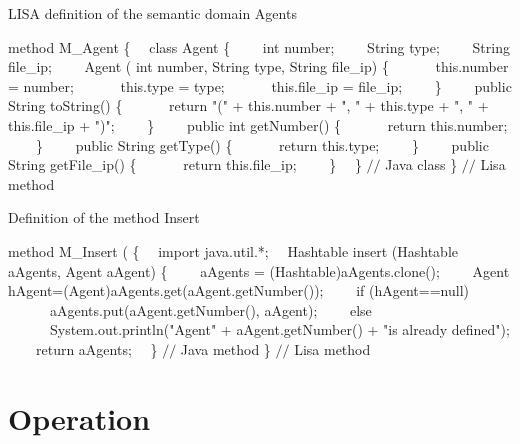 \documentclass[preprint, prX]{revtex4}
\begin{document}
\begin{algorithm}[tbh]
\caption{LISA definition of the semantic domain Agents}
\label{alg:m_ag_lisa}
\footnotesize
\begin{algorithmic}[1]
\STATE method M\_Agent \{
\STATE \ \ class Agent \{
\STATE \ \ \ \ int number;
\STATE \ \ \ \ String type;
\STATE \ \ \ \ String file\_ip;
\STATE \ \ \ \ Agent ( int number, String type, String file\_ip) \{
\STATE \ \ \ \ \ \ this.number = number;
\STATE \ \ \ \ \ \ this.type = type;
\STATE \ \ \ \ \ \ this.file\_ip = file\_ip;
\STATE \ \ \ \ \}
\STATE \ \ \ \ public String toString() \{
\STATE \ \ \ \ \ \ return "(" + this.number + ", " + this.type + ", " + this.file\_ip + ")";
\STATE \ \ \ \ \}
\STATE \ \ \ \ public int getNumber() \{
\STATE \ \ \ \ \ \ return this.number;
\STATE \ \ \ \ \}
\STATE \ \ \ \ public String getType() \{
\STATE \ \ \ \ \ \ return this.type;
\STATE \ \ \ \ \}
\STATE \ \ \ \ public String getFile\_ip() \{
\STATE \ \ \ \ \ \ return this.file\_ip;
\STATE \ \ \ \ \}
\STATE \ \ \} $//$ Java class
\STATE \} $//$ Lisa method
\end{algorithmic}
\normalsize
\end{algorithm}

\begin{algorithm}[tbh]
\caption{Definition of the method Insert}
\label{alg:m_ins_lisa}
\footnotesize
\begin{algorithmic}[1]
\STATE method M\_Insert ( \{
\STATE \ \ import java.util.*;
\STATE \ \ Hashtable insert (Hashtable aAgents, Agent aAgent) \{
\STATE \ \ \ \ aAgents = (Hashtable)aAgents.clone();
\STATE \ \ \ \ Agent hAgent=(Agent)aAgents.get(aAgent.getNumber());
\STATE \ \ \ \ if (hAgent==null)
\STATE \ \ \ \ \ \ aAgents.put(aAgent.getNumber(), aAgent);
\STATE \ \ \ \ else
\STATE \ \ \ \ \ \ System.out.println("Agent" + aAgent.getNumber() + "is already defined");
\STATE \ \ \ \ return aAgents;
\STATE \ \ \} $//$ Java method
\STATE \} $//$ Lisa method
\end{algorithmic}
\normalsize
\end{algorithm}


\section{Operation}
\end{document}
